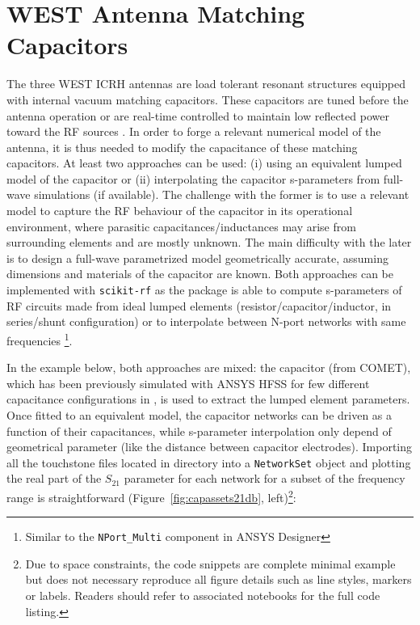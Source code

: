 \documentclass{aip-cp}
\begin{document}
\section{WEST Antenna Matching Capacitors}
The three WEST ICRH antennas are load tolerant resonant structures equipped with internal vacuum matching capacitors. These capacitors are tuned before the antenna operation or are real-time controlled to maintain low reflected power toward the RF sources \cite{Helou2016}. In order to forge a relevant numerical model of the antenna, it is thus needed to modify the capacitance of these matching capacitors. At least two approaches can be used: (i) using an equivalent lumped model of the capacitor or (ii) interpolating the capacitor s-parameters from full-wave simulations (if available). The challenge with the former is to use a relevant model to capture the RF behaviour of the capacitor in its operational environment, where parasitic capacitances/inductances may arise from surrounding elements and are mostly unknown. The main difficulty with the later is to design a full-wave parametrized model geometrically accurate, assuming dimensions and materials of the capacitor are known. Both approaches can be implemented with \texttt{scikit-rf} as the package is able to compute s-parameters of RF circuits made from ideal lumped elements (resistor/capacitor/inductor, in series/shunt configuration)  or to interpolate between N-port networks with same frequencies \footnote{Similar to the \texttt{NPort\_Multi} component in ANSYS Designer}.

In the example below, both approaches are mixed: the capacitor (from COMET), which has been previously simulated with ANSYS HFSS for few different capacitance configurations in \cite{Helou2016}, is used to extract the lumped element parameters. Once fitted to an equivalent model, the capacitor networks can be driven as a function of their capacitances, while s-parameter interpolation only depend of geometrical parameter (like the distance between capacitor electrodes). Importing all the touchstone files located in directory into a \texttt{NetworkSet} object and plotting the real part of the $S_{21}$ parameter for each network for a subset of the frequency range is straightforward (Figure~\ref{fig:capassets21db}, left)\footnote{Due to space constraints, the code snippets are complete minimal example but does not necessary reproduce all figure details such as line styles, markers or labels. Readers should refer to associated notebooks for the full code listing.}: 
\end{document}

